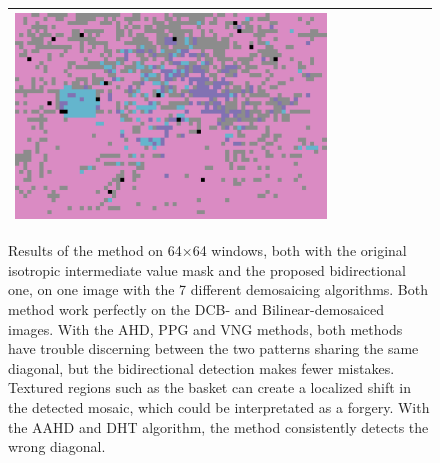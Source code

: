 \documentclass{ipol}
\begin{document}
\begin{figure}[ht]
\begin{tabular}{cccccccc}
                \includegraphics[width=\s]{images/bike/VNG/bid_64_grids.png}\\
                \bottomrule
        \end{tabular}
\caption{Results of the method on 64×64 windows, both with the original isotropic intermediate value mask and the proposed bidirectional one, on one image with the 7 different demosaicing algorithms. Both method work perfectly on the DCB- and Bilinear-demosaiced images. With the AHD, PPG and VNG methods, both methods have trouble discerning between the two patterns sharing the same diagonal, but the bidirectional detection makes fewer mistakes. Textured regions such as the basket can create a localized shift in the detected mosaic, which could be interpretated as a forgery.
With the AAHD and DHT algorithm, the method consistently detects the wrong diagonal.}
\label{fig:bike}
\end{figure}
\end{document}
